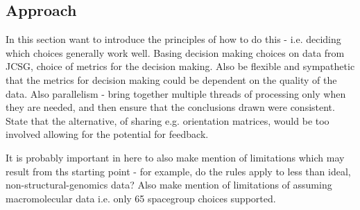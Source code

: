 \documentclass[a4paper,11pt]{article}
\begin{document}
\subsection{Approach}

In this section want to introduce the principles of how to do this -
i.e. deciding which choices generally work well. Basing decision
making choices on data from JCSG, choice of metrics for the decision
making. Also be flexible and sympathetic that the metrics for decision
making could be dependent on the quality of the data. Also parallelism
- bring together multiple threads of processing only when they are
needed, and then ensure that the conclusions drawn were
consistent. State that the alternative, of sharing e.g. orientation
matrices, would be too involved allowing for the potential for feedback.

It is probably important in here to also make mention of limitations
which may result from ths starting point - for example, do the rules
apply to less than ideal, non-structural-genomics data? Also make
mention of limitations of assuming macromolecular data i.e. only 65
spacegroup choices supported. 
\end{document}
